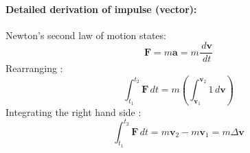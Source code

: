 \documentclass[12pt]{article}
\begin{document}
\paragraph{Detailed derivation of impulse (vector):}
\label{DD:impulseVDeriv}
Newton's second law of motion states:
\begin{displaymath}
\mathbf{F}=m \mathbf{a}=m \frac{\,d\mathbf{v}}{\,dt}
\end{displaymath}
Rearranging :
\begin{displaymath}
\int_{{t_{1}}}^{{t_{2}}}{\mathbf{F}}\,dt=m \left(\int_{{\mathbf{v}_{1}}}^{{\mathbf{v}_{2}}}{1}\,d\mathbf{v}\right)
\end{displaymath}
Integrating the right hand side :
\begin{displaymath}
\int_{{t_{1}}}^{{t_{2}}}{\mathbf{F}}\,dt=m {\mathbf{v}_{2}}-m {\mathbf{v}_{1}}=m Δ\mathbf{v}
\end{displaymath}
\par~
\end{document}
